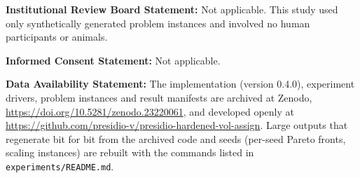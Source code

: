\documentclass[systems,article,submit,moreauthors,pdftex]{Definitions/mdpi}
\providecommand{\dataavailability}[1]{\vspace{6pt}\noindent\textbf{Data Availability Statement:} #1\par}
\providecommand{\institutionalreview}[1]{\vspace{6pt}\noindent\textbf{Institutional Review Board Statement:} #1\par}
\providecommand{\informedconsent}[1]{\vspace{6pt}\noindent\textbf{Informed Consent Statement:} #1\par}
\begin{document}

\institutionalreview{Not applicable. This study used only synthetically generated problem instances and involved no human participants or animals.}

\informedconsent{Not applicable.}

\dataavailability{The implementation (version 0.4.0), experiment drivers, problem instances and result manifests are archived at Zenodo, \url{https://doi.org/10.5281/zenodo.23220061}, and developed openly at \url{https://github.com/presidio-v/presidio-hardened-vol-assign}. Large outputs that regenerate bit for bit from the archived code and seeds (per-seed Pareto fronts, scaling instances) are rebuilt with the commands listed in \texttt{experiments/README.md}.}




\end{document}
